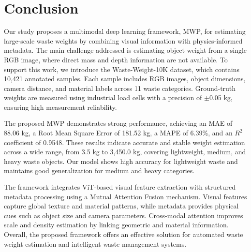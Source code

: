 \documentclass[journal,twoside,web]{ieeecolor}
\begin{document}

\section{Conclusion}
\label{sec7}
Our study proposes a multimodal deep learning framework, MWP, for estimating large-scale waste weights by combining visual information with physics-informed metadata. The main challenge addressed is estimating object weight from a single RGB image, where direct mass and depth information are not available. To support this work, we introduce the Waste-Weight-10K dataset, which contains 10,421 annotated samples. Each sample includes RGB images, object dimensions, camera distance, and material labels across 11 waste categories. Ground-truth weights are measured using industrial load cells with a precision of $\pm$0.05 kg, ensuring high measurement reliability.

The proposed MWP demonstrates strong performance, achieving an MAE of 88.06 kg, a Root Mean Square Error of 181.52 kg, a MAPE of 6.39\%, and an $R^2$ coefficient of 0.9548. These results indicate accurate and stable weight estimation across a wide range, from 3.5 kg to 3,450.0 kg, covering lightweight, medium, and heavy waste objects. Our model shows high accuracy for lightweight waste and maintains good generalization for medium and heavy categories.

The framework integrates ViT-based visual feature extraction with structured metadata processing using a Mutual Attention Fusion mechanism. Visual features capture global texture and material patterns, while metadata provides physical cues such as object size and camera parameters. Cross-modal attention improves scale and density estimation by linking geometric and material information. Overall, the proposed framework offers an effective solution for automated waste weight estimation and intelligent waste management systems.

\end{document}
